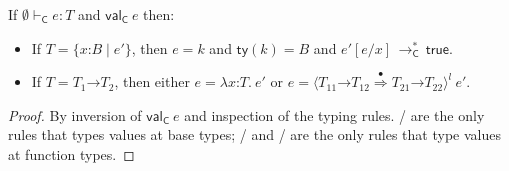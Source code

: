 \documentclass[9pt]{extarticle}
\newcommand{\ottnt}[1]{\mathit{#1}}
\newcommand{\ottsym}[1]{#1}
\begin{document}
\begin{lemma}
  \label{lem:classiccanonicalforms}
  If $ \emptyset   \vdash _{  \mathsf{C}  }  \ottnt{e}  :  \ottnt{T} $ and $ \mathsf{val} _{  \mathsf{C}  }~ \ottnt{e} $ then:
\begin{itemize}
  \item If $\ottnt{T}  \ottsym{=}   \{ \mathit{x} \mathord{:} \ottnt{B} \mathrel{\mid} \ottnt{e'} \} $, then $\ottnt{e}  \ottsym{=}  \ottnt{k}$ and $ \mathsf{ty} ( \ottnt{k} )   \ottsym{=}  \ottnt{B}$
    and $ \ottnt{e'}  [  \ottnt{e} / \mathit{x}  ]  \,  \longrightarrow ^{*}_{  \mathsf{C}  }  \,  \mathsf{true} $.
  \item If $\ottnt{T}  \ottsym{=}   \ottnt{T_{{\mathrm{1}}}} \mathord{ \rightarrow } \ottnt{T_{{\mathrm{2}}}} $, then either $\ottnt{e}  \ottsym{=}   \lambda \mathit{x} \mathord{:} \ottnt{T} .~  \ottnt{e'} $ or $\ottnt{e}  \ottsym{=}   \langle   \ottnt{T_{{\mathrm{11}}}} \mathord{ \rightarrow } \ottnt{T_{{\mathrm{12}}}}   \mathord{ \overset{\bullet}{\Rightarrow} }   \ottnt{T_{{\mathrm{21}}}} \mathord{ \rightarrow } \ottnt{T_{{\mathrm{22}}}}   \rangle^{ \ottnt{l} } ~  \ottnt{e'} $.
  \end{itemize}
{\iffull
  \begin{proof}
    By inversion of $ \mathsf{val} _{  \mathsf{C}  }~ \ottnt{e} $ and inspection of the typing
    rules. / are the only rules that types values at
    base types; / and / are the only
    rules that type values at function types.
  \end{proof}
  \fi}
\end{lemma}
\end{document}
